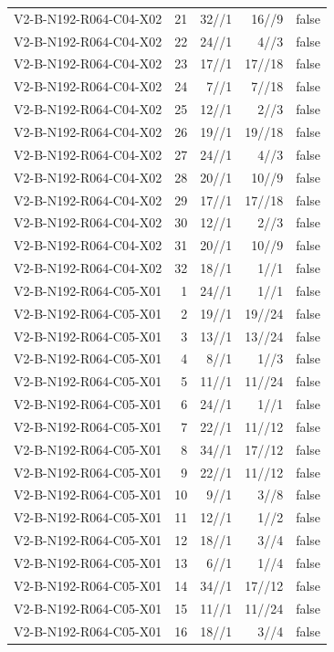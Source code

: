 {\begin{longtable}{lrrrr}
V2-B-N192-R064-C04-X02 & 21 & 32//1 & 16//9 & false \\
V2-B-N192-R064-C04-X02 & 22 & 24//1 & 4//3 & false \\
V2-B-N192-R064-C04-X02 & 23 & 17//1 & 17//18 & false \\
V2-B-N192-R064-C04-X02 & 24 & 7//1 & 7//18 & false \\
V2-B-N192-R064-C04-X02 & 25 & 12//1 & 2//3 & false \\
V2-B-N192-R064-C04-X02 & 26 & 19//1 & 19//18 & false \\
V2-B-N192-R064-C04-X02 & 27 & 24//1 & 4//3 & false \\
V2-B-N192-R064-C04-X02 & 28 & 20//1 & 10//9 & false \\
V2-B-N192-R064-C04-X02 & 29 & 17//1 & 17//18 & false \\
V2-B-N192-R064-C04-X02 & 30 & 12//1 & 2//3 & false \\
V2-B-N192-R064-C04-X02 & 31 & 20//1 & 10//9 & false \\
V2-B-N192-R064-C04-X02 & 32 & 18//1 & 1//1 & false \\
V2-B-N192-R064-C05-X01 & 1 & 24//1 & 1//1 & false \\
V2-B-N192-R064-C05-X01 & 2 & 19//1 & 19//24 & false \\
V2-B-N192-R064-C05-X01 & 3 & 13//1 & 13//24 & false \\
V2-B-N192-R064-C05-X01 & 4 & 8//1 & 1//3 & false \\
V2-B-N192-R064-C05-X01 & 5 & 11//1 & 11//24 & false \\
V2-B-N192-R064-C05-X01 & 6 & 24//1 & 1//1 & false \\
V2-B-N192-R064-C05-X01 & 7 & 22//1 & 11//12 & false \\
V2-B-N192-R064-C05-X01 & 8 & 34//1 & 17//12 & false \\
V2-B-N192-R064-C05-X01 & 9 & 22//1 & 11//12 & false \\
V2-B-N192-R064-C05-X01 & 10 & 9//1 & 3//8 & false \\
V2-B-N192-R064-C05-X01 & 11 & 12//1 & 1//2 & false \\
V2-B-N192-R064-C05-X01 & 12 & 18//1 & 3//4 & false \\
V2-B-N192-R064-C05-X01 & 13 & 6//1 & 1//4 & false \\
V2-B-N192-R064-C05-X01 & 14 & 34//1 & 17//12 & false \\
V2-B-N192-R064-C05-X01 & 15 & 11//1 & 11//24 & false \\
V2-B-N192-R064-C05-X01 & 16 & 18//1 & 3//4 & false \\

\end{longtable}}
